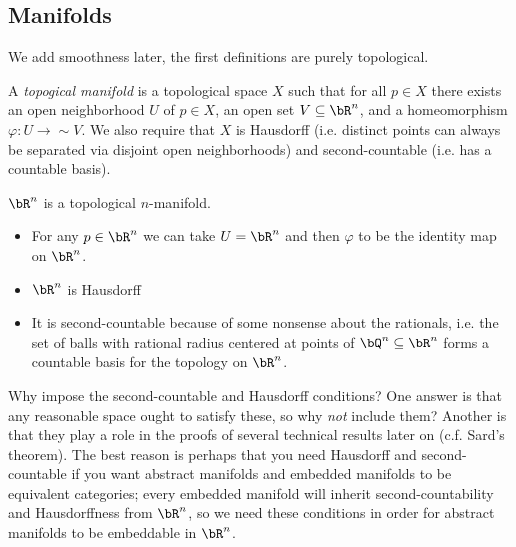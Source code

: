\subsection{Manifolds}
We add smoothness later, the first definitions are purely topological.
\begin{defn}\label{defn:top-manifold}
	A \emph{topogical manifold} is a topological space $X$ such that for all $p\in X$ there exists an open neighborhood $U$ of $p \in X$, an open set $V \subseteq \bR^n$, and a homeomorphism $\varphi:U\to{\sim}V$. We also require that $X$ is Hausdorff (i.e. distinct points can always be separated via disjoint open neighborhoods) and second-countable (i.e. has a countable basis). 
\end{defn}
\begin{example}
	$\bR^n$ is a topological $n$-manifold.
	\begin{itemize}
		\item For any $p \in \bR^n$ we can take $U = \bR^n$ and then $\varphi$ to be the identity map on $\bR^n$.
		\item $\bR^n$ is Hausdorff
		\item It is second-countable because of some nonsense about the rationals, i.e. the set of balls with rational radius centered at points of $\bQ^n \subseteq \bR^n$ forms a countable basis for the topology on $\bR^n$.
	\end{itemize}
\end{example}
Why impose the second-countable and Hausdorff conditions? One answer is that any reasonable space ought to satisfy these, so why \emph{not} include them? Another is that they play a role in the proofs of several technical results later on (c.f. Sard's theorem). The best reason is perhaps that you need Hausdorff and second-countable if you want abstract manifolds and embedded manifolds to be equivalent categories; every embedded manifold will inherit second-countability and Hausdorffness from $\bR^n$, so we need these conditions in order for abstract manifolds to be embeddable in $\bR^n$.

